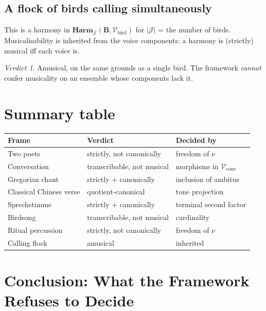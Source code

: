 \documentclass[11pt]{article}
\theoremstyle{definition}
\theoremstyle{plain}
\theoremstyle{remark}
\newtheorem*{verdict}{Verdict}
\newcommand{\B}{\mathbf{B}}
\newcommand{\V}{\mathcal{V}}
\newcommand{\J}{\mathcal{J}}
\newcommand{\Harm}{\mathbf{Harm}}
\begin{document}
\subsection{A flock of birds calling simultaneously}
This is a harmony in $\Harm_\J(\B, \V_{\mathrm{bird}})$ for
$|\J|$ = the number of birds. Musicalisability is inherited from the
voice components: a harmony is (strictly) musical iff each voice is.

\begin{verdict}
Amusical, on the same grounds as a single bird. The framework
\emph{cannot} confer musicality on an ensemble whose components lack
it.
\end{verdict}

\section{Summary table}

\begin{center}\small
\renewcommand{\arraystretch}{1.25}
\begin{tabular}{lll}
\hline
\textbf{Frame} & \textbf{Verdict} & \textbf{Decided by} \\
\hline
Two poets               & strictly, not canonically  & freedom of $\nu$ \\
Conversation            & transcribable, not musical & morphisms in $\V_{\mathrm{conv}}$ \\
Gregorian chant         & strictly + canonically     & inclusion of ambitus \\
Classical Chinese verse & quotient-canonical         & tone projection \\
Sprechstimme            & strictly + canonically     & terminal second factor \\
Birdsong                & transcribable, not musical & cardinality \\
Ritual percussion       & strictly, not canonically  & freedom of $\nu$ \\
Calling flock           & amusical                   & inherited \\
\hline
\end{tabular}
\end{center}

\section{Conclusion: What the Framework Refuses to Decide}
\end{document}
